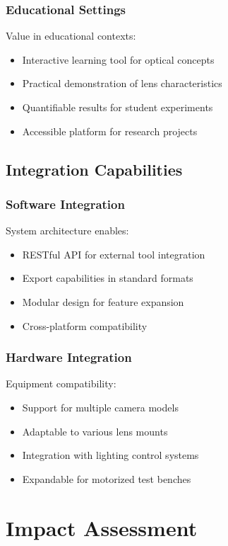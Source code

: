 \subsubsection{Educational Settings}
Value in educational contexts:
\begin{itemize}
    \item Interactive learning tool for optical concepts
    \item Practical demonstration of lens characteristics
    \item Quantifiable results for student experiments
    \item Accessible platform for research projects
\end{itemize}

\subsection{Integration Capabilities}

\subsubsection{Software Integration}
System architecture enables:
\begin{itemize}
    \item RESTful API for external tool integration
    \item Export capabilities in standard formats
    \item Modular design for feature expansion
    \item Cross-platform compatibility
\end{itemize}

\subsubsection{Hardware Integration}
Equipment compatibility:
\begin{itemize}
    \item Support for multiple camera models
    \item Adaptable to various lens mounts
    \item Integration with lighting control systems
    \item Expandable for motorized test benches
\end{itemize}

\section{Impact Assessment}

